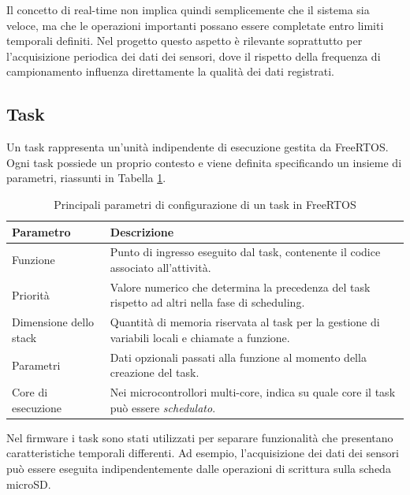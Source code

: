 \vspace{.25cm}

Il concetto di real-time non implica quindi semplicemente che il sistema
sia veloce, ma che le operazioni importanti possano essere completate entro
limiti temporali definiti. Nel progetto questo aspetto è rilevante soprattutto
per l'acquisizione periodica dei dati dei sensori, dove il rispetto della
frequenza di campionamento influenza direttamente la qualità dei dati
registrati.

\subsection{Task}
Un task rappresenta un'unità indipendente di esecuzione gestita da
FreeRTOS. Ogni task possiede un proprio contesto e viene definita
specificando un insieme di parametri, riassunti in Tabella
\ref{tab:freertos-task-params}.

\begin{table}[H]
    \centering
    \begin{tabular}{lp{9cm}}
        \hline
        \textbf{Parametro} & \textbf{Descrizione} \\
        \hline
        Funzione & Punto di ingresso eseguito dal task, contenente il codice associato all'attività. \\ \hline
        Priorità & Valore numerico che determina la precedenza del task rispetto ad altri nella fase di scheduling. \\ \hline
        Dimensione dello stack & Quantità di memoria riservata al task per la gestione di variabili locali e chiamate a funzione. \\ \hline
        Parametri & Dati opzionali passati alla funzione al momento della creazione del task. \\ \hline
        Core di esecuzione & Nei microcontrollori multi-core, indica su quale core il task può essere \textit{schedulato}. \\ \hline
    \end{tabular}
    \caption{Principali parametri di configurazione di un task in FreeRTOS}
    \label{tab:freertos-task-params}
\end{table}

Nel firmware i task sono stati utilizzati per separare funzionalità che
presentano caratteristiche temporali differenti. Ad esempio, l'acquisizione
dei dati dei sensori può essere eseguita indipendentemente dalle operazioni
di scrittura sulla scheda microSD.

